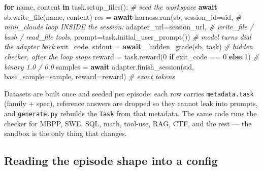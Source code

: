 \documentclass[
  paper=a4,
  ,captions=tableheading
]{scrartcl}
\newenvironment{Shaded}{}{}
\newcommand{\CommentTok}[1]{\textcolor[rgb]{0.38,0.63,0.69}{\textit{#1}}}
\newcommand{\ControlFlowTok}[1]{\textcolor[rgb]{0.00,0.44,0.13}{\textbf{#1}}}
\newcommand{\DecValTok}[1]{\textcolor[rgb]{0.25,0.63,0.44}{#1}}
\newcommand{\KeywordTok}[1]{\textcolor[rgb]{0.00,0.44,0.13}{\textbf{#1}}}
\newcommand{\NormalTok}[1]{#1}
\newcommand{\OperatorTok}[1]{\textcolor[rgb]{0.40,0.40,0.40}{#1}}
\begin{document}
\begin{Shaded}
\begin{Highlighting}[]
\ControlFlowTok{for}\NormalTok{ name, content }\KeywordTok{in}\NormalTok{ task.setup\_files():                   }\CommentTok{\# seed the workspace}
    \ControlFlowTok{await}\NormalTok{ sb.write\_file(name, content)}
\NormalTok{res }\OperatorTok{=} \ControlFlowTok{await}\NormalTok{ harness.run(sb, session\_id}\OperatorTok{=}\NormalTok{sid,                }\CommentTok{\# mini\_claude loop INSIDE the session:}
\NormalTok{                        adapter\_url}\OperatorTok{=}\NormalTok{session\_url,           }\CommentTok{\#   write\_file / bash / read\_file tools,}
\NormalTok{                        prompt}\OperatorTok{=}\NormalTok{task.initial\_user\_prompt()) }\CommentTok{\#   model turns dial the adapter back}
\NormalTok{exit\_code, stdout }\OperatorTok{=} \ControlFlowTok{await}\NormalTok{ \_hidden\_grade(sb, task)          }\CommentTok{\# hidden checker, after the loop stops}
\NormalTok{reward }\OperatorTok{=}\NormalTok{ task.reward(}\DecValTok{0} \ControlFlowTok{if}\NormalTok{ exit\_code }\OperatorTok{==} \DecValTok{0} \ControlFlowTok{else} \DecValTok{1}\NormalTok{)           }\CommentTok{\# binary 1.0 / 0.0}
\NormalTok{samples }\OperatorTok{=} \ControlFlowTok{await}\NormalTok{ adapter.finish\_session(sid, base\_sample}\OperatorTok{=}\NormalTok{sample, reward}\OperatorTok{=}\NormalTok{reward)  }\CommentTok{\# exact tokens}
\end{Highlighting}
\end{Shaded}

Datasets are built once and seeded per episode: each row carries
\texttt{metadata.task} (family + spec), reference answers are dropped so
they cannot leak into prompts, and \texttt{generate.py} rebuilds the
\texttt{Task} from that metadata. The same code runs the checker for
MBPP, SWE, SQL, math, tool-use, RAG, CTF, and the rest --- the sandbox
is the only thing that changes.

\hypertarget{reading-the-episode-shape-into-a-config}{%
\subsection{Reading the episode shape into a
config}\label{reading-the-episode-shape-into-a-config}}
\end{document}
